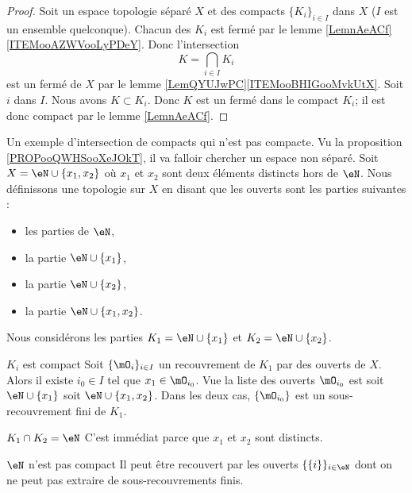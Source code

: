 \begin{proof}
    Soit un espace topologie séparé \( X\) et des compacts \( \{ K_i \}_{i\in I}\) dans \( X\) (\( I\) est un ensemble quelconque). Chacun des \( K_i\) est fermé par le lemme \ref{LemnAeACf}\ref{ITEMooAZWVooLyPDeY}. Donc l'intersection
    \begin{equation}
        K=\bigcap_{i\in I} K_i
    \end{equation}
    est un fermé de \( X\) par le lemme \ref{LemQYUJwPC}\ref{ITEMooBHIGooMvkUtX}. Soit \( i\) dans \( I\). Nous avons \( K\subset K_i\). Donc \( K\) est un fermé dans le compact \( K_i\); il est donc compact par le lemme \ref{LemnAeACf}.
\end{proof}

\begin{example}
    Un exemple d'intersection de compacts qui n'est pas compacte. Vu la proposition \ref{PROPooQWHSooXeJOkT}, il va falloir chercher un espace non séparé. Soit \( X=\eN\cup\{ x_1,x_2 \}\) où \( x_1\) et \( x_2\) sont deux éléments distincts hors de \( \eN\). Nous définissons une topologie sur \( X\) en disant que les ouverts sont les parties suivantes :
    \begin{itemize}
        \item les parties de \( \eN\),
        \item la partie \( \eN\cup\{ x_1 \}\),
        \item la partie \( \eN\cup\{ x_2 \}\),
        \item la partie \( \eN\cup\{ x_1,x_2 \}\).
    \end{itemize}
    Nous considérons les parties \( K_1=\eN\cup\{ x_1 \}\) et \(K_2= \eN\cup \{ x_2 \}\).
    \begin{subproof}
    \item[\( K_i\) est compact]
        Soit \( \{ \mO_i \}_{i\in I}\) un recouvrement de \( K_1\) par des ouverts de \( X\). Alors il existe \( i_0\in I\) tel que \( x_1\in\mO_{i_0}\). Vue la liste des ouverts \( \mO_{i_0}\) est soit \( \eN\cup\{ x_1 \}\) soit \( \eN\cup\{ x_1,x_2 \}\). Dans les deux cas, \( \{ \mO_{i_0} \}\) est un sous-recouvrement fini de \( K_1\).
    \item[\( K_1\cap K_2=\eN\)]
        C'est immédiat parce que \( x_1\) et \( x_2\) sont distincts.
    \item[\( \eN\) n'est pas compact]
        Il peut être recouvert par les ouverts \( \{ \{ i \} \}_{i\in \eN}\) dont on ne peut pas extraire de sous-recouvrements finis.
    \end{subproof}
\end{example}

